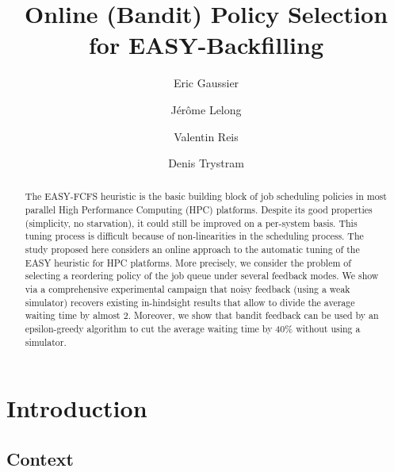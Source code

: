 \documentclass[sigconf,anonymous]{acmart}
\begin{document}
%
\title{Online (Bandit) Policy Selection for EASY-Backfilling}

\author{Eric Gaussier}
\author{J\'er\^ome Lelong}
\author{Valentin Reis}
\author{Denis Trystram}

\begin{abstract}

  The EASY-FCFS heuristic is the basic building block of job scheduling
  policies in most parallel High Performance Computing (HPC) platforms. Despite
  its good properties (simplicity, no starvation), it could still be improved
  on a per-system basis. This tuning process is difficult because of
  non-linearities in the scheduling process. The study proposed here considers
  an online approach to the automatic tuning of the EASY heuristic for HPC
  platforms. More precisely, we consider the problem of selecting a reordering
  policy of the job queue under several feedback modes. We show via a
  comprehensive experimental campaign that noisy feedback (using a weak
  simulator) recovers existing in-hindsight results that allow to divide the
  average waiting time by almost 2. Moreover, we show that bandit feedback can
  be used by an epsilon-greedy algorithm to cut the average waiting time by
  40\% without using a simulator.

\end{abstract}

\maketitle


\section{Introduction}
\label{sec:intro}

\subsection{Context}
\end{document}
